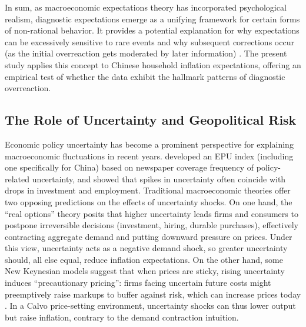 \documentclass[12pt]{article}
\begin{document}
In sum, as macroeconomic expectations theory has incorporated psychological realism, diagnostic expectations emerge as a unifying framework for certain forms of non-rational behavior. It provides a potential explanation for why expectations can be excessively sensitive to rare events and why subsequent corrections occur (as the initial overreaction gets moderated by later information) \cite{Bordalo2020}. The present study applies this concept to Chinese household inflation expectations, offering an empirical test of whether the data exhibit the hallmark patterns of diagnostic overreaction.

\subsection{The Role of Uncertainty and Geopolitical Risk}
Economic policy uncertainty has become a prominent perspective for explaining macroeconomic fluctuations in recent years. \cite{Baker2016} developed an EPU index (including one specifically for China) based on newspaper coverage frequency of policy-related uncertainty, and showed that spikes in uncertainty often coincide with drops in investment and employment. Traditional macroeconomic theories offer two opposing predictions on the effects of uncertainty shocks. On one hand, the “real options” theory \cite{Bernanke1983, Bloom2009} posits that higher uncertainty leads firms and consumers to postpone irreversible decisions (investment, hiring, durable purchases), effectively contracting aggregate demand and putting downward pressure on prices. Under this view, uncertainty acts as a negative demand shock, so greater uncertainty should, all else equal, reduce inflation expectations. On the other hand, some New Keynesian models suggest that when prices are sticky, rising uncertainty induces “precautionary pricing”: firms facing uncertain future costs might preemptively raise markups to buffer against risk, which can increase prices today \cite{Basu2017, Oh2020}. In a Calvo price-setting environment, uncertainty shocks can thus lower output but raise inflation, contrary to the demand contraction intuition.
\end{document}
